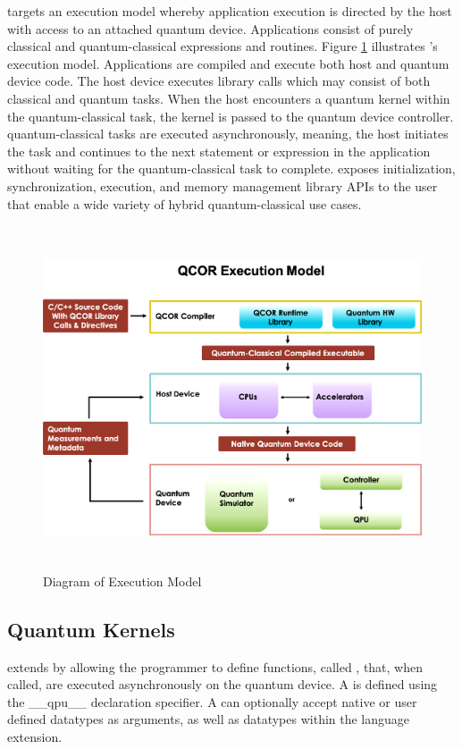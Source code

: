 \qcor targets an execution model whereby application execution is directed by the host with access to an attached quantum device. Applications consist of purely classical and quantum-classical expressions and routines. Figure \ref{fig:exec_model} illustrates \qcor's execution model. Applications are compiled and execute both host and quantum device code. The host device executes \qcor library calls which may consist of both classical and quantum tasks. When the host encounters a quantum kernel within the quantum-classical task, the kernel is passed to the quantum device controller. \qcor quantum-classical tasks are executed asynchronously, meaning, the host initiates the task and continues to the next statement or expression in the application without waiting for the quantum-classical task to complete.
\qcor exposes initialization, synchronization, execution, and memory management library \ac{APIs} to the user that enable a wide variety of hybrid quantum-classical use cases.

\begin{figure}
 \centering
 \includegraphics[width=5in,height=4in]{figures/Execution_Model_Illustration_v3.png}
  \caption{Diagram of \qcor Execution Model}
  \label{fig:exec_model}
\end{figure}


\subsection{\textbf{Quantum Kernels}}\label{subsec:kernel}
\qcor extends \CorCpp by allowing the programmer to define functions, called , that, when called, are executed asynchronously on the quantum device. A  is defined using the \_\_qpu\_\_ declaration specifier. A  can optionally accept native or user defined \CorCpp datatypes as arguments, as well as datatypes within the \qcor language extension.

